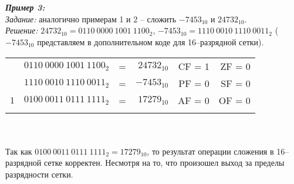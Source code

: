 \\
\\\emph{\textbf{Пример 3:}}
\\\emph{Задание:} аналогично примерам 1 и 2 -- сложить $-7453_{10}$ и $24732_{10}$.
\\\emph{Решение:} $24732_{10} = 0110\ 0000\ 1001\ 1100_{2}$, $-7453_{10} = 1110\ 0010\ 1110\ 0011_{2}$ ($-7453_{10}$ представляем в дополнительном коде для 16--разрядной сетки).
\\
\begin{minipage}[c]{10cm}
\begin{tabular}{r l c r | r r |}
\\
\hhline{~~~~----}
\multirow{2}{*}{+} & $0110\ 0000\ 1001\ 1100_{2}$ & = & $24732_{10}$ & CF = 1 & ZF = 0
\\ & $1110\ 0010\ 1110\ 0011_{2}$ & = & $-7453_{10}$ &  PF = 0 & SF = 0
\\ \hhline{----~~~}
 $1$& $0100\ 0011\ 0111\ 1111_{2}$ & = & $17279_{10}$ & AF = 0 & OF = 0
\\\hhline{~~~~----}
\end{tabular}
\end{minipage}
\\
\\Так как $0100\ 0011\ 0111\ 1111_{2} = 17279_{10}$, то результат операции сложения в 16--разрядной сетке корректен. Несмотря на то, что произошел выход за пределы разрядности сетки.